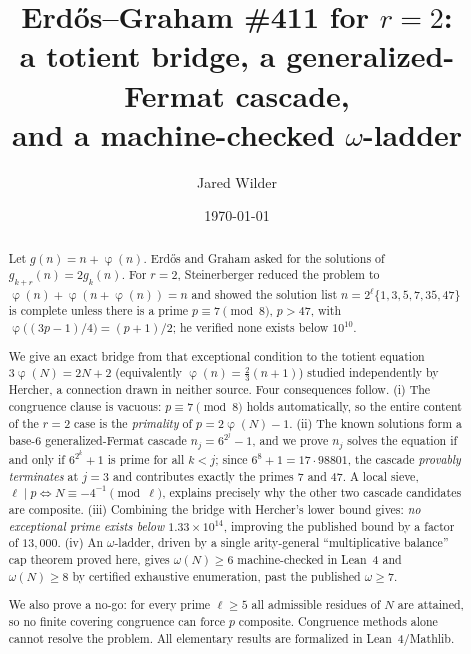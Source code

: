 \documentclass[11pt,reqno]{amsart}
\theoremstyle{plain}
\theoremstyle{definition}
\DeclareMathOperator{\tot}{\varphi}
\begin{document}
\title[Erd\H{o}s--Graham \#411 for $r=2$]{Erd\H{o}s--Graham \#411 for $r=2$:\\
a totient bridge, a generalized-Fermat cascade,\\ and a machine-checked $\omega$-ladder}

\author{Jared Wilder}

\date{\today}

\begin{abstract}
Let $g(n)=n+\tot(n)$. Erd\H{o}s and Graham asked for the solutions of $g_{k+r}(n)=2g_k(n)$.
For $r=2$, Steinerberger reduced the problem to $\tot(n)+\tot(n+\tot(n))=n$ and showed the
solution list $n=2^{\ell}\{1,3,5,7,35,47\}$ is complete unless there is a prime
$p\equiv 7 \pmod 8$, $p>47$, with $\tot\!\big((3p-1)/4\big)=(p+1)/2$; he verified none exists
below $10^{10}$.

We give an exact bridge from that exceptional condition to the totient equation
$3\tot(N)=2N+2$ (equivalently $\tot(n)=\tfrac23(n+1)$) studied independently by Hercher, a
connection drawn in neither source. Four consequences follow.
(i) The congruence clause is vacuous: $p\equiv7\pmod 8$ holds automatically, so the entire
content of the $r=2$ case is the \emph{primality} of $p=2\tot(N)-1$.
(ii) The known solutions form a base-$6$ generalized-Fermat cascade $n_j=6^{2^j}-1$, and we
prove $n_j$ solves the equation if and only if $6^{2^k}+1$ is prime for all $k<j$; since
$6^{8}+1=17\cdot 98801$, the cascade \emph{provably terminates} at $j=3$ and contributes
exactly the primes $7$ and $47$. A local sieve, $\ell\mid p \iff N\equiv-4^{-1}\!\!\pmod \ell$,
explains precisely why the other two cascade candidates are composite.
(iii) Combining the bridge with Hercher's lower bound gives: \emph{no exceptional prime exists
below $1.33\times10^{14}$}, improving the published bound by a factor of $13{,}000$.
(iv) An $\omega$-ladder, driven by a single arity-general ``multiplicative balance'' cap
theorem proved here, gives $\omega(N)\ge 6$ machine-checked in Lean~4 and $\omega(N)\ge 8$
by certified exhaustive enumeration, past the published $\omega\ge7$.

We also prove a no-go: for every prime $\ell\ge5$ all admissible residues of $N$ are
attained, so no finite covering congruence can force $p$ composite. Congruence methods alone
cannot resolve the problem. All elementary results are formalized in Lean~4/Mathlib.
\end{abstract}

\maketitle
\end{document}
